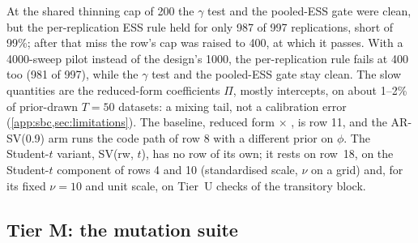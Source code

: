 At the shared thinning cap of 200 the $\gamma$ test and the pooled-ESS gate were clean, but the
per-replication ESS rule held for only 987 of 997 replications, short of 99\%; after that miss the
row's cap was raised to 400, at which it passes. With a 4000-sweep pilot instead of the design's
1000, the per-replication rule fails at 400 too (981 of 997), while the $\gamma$ test and the
pooled-ESS gate stay clean. The
slow quantities are the reduced-form coefficients $\Pi$, mostly intercepts, on about 1--2\% of
prior-drawn $T = 50$ datasets: a mixing tail, not a calibration error
(\cref{app:sbc,sec:limitations}). %
The baseline, reduced form $\times$ , is row 11, and the AR-SV(0.9)
arm runs the code path of row 8 with a different prior on $\phi$. %
The Student-$t$ variant, SV(rw, $t$), has no row of its own; it rests on row~18, on the Student-$t$
component of rows 4 and 10 (standardised scale, $\nu$ on a grid) and, for its fixed $\nu = 10$ and
unit scale, on Tier~U checks of the transitory block. %

\subsection{Tier M: the mutation suite}\label{sec:validation-mutation}


